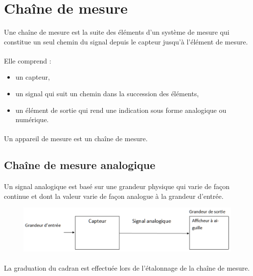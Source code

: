 \documentclass{article}
\begin{document}
\newpage
\section{Chaîne de mesure}
\paragraph{}
Une chaîne de mesure est la suite des éléments d'un système de mesure qui constitue un seul chemin du signal depuis le capteur jusqu'à l'élément de mesure.

\paragraph{}
Elle comprend :
\begin{itemize}
    \item un capteur,
    \item un signal qui suit un chemin dans la succession des éléments,
    \item un élément de sortie qui rend une indication sous forme analogique ou numérique.
\end{itemize}

\paragraph{}
Un appareil de mesure est un chaîne de mesure.

\subsection{Chaîne de mesure analogique}
\paragraph{}
Un signal analogique est basé sur une grandeur physique qui varie de façon continue et dont la valeur varie de façon analogue à la grandeur d'entrée.

\begin{figure}[H]
    \centering
    \includegraphics[width=0.8\linewidth]{images/chaine-mesure-analogique.png}    
\end{figure}

\paragraph{}
La graduation du cadran est effectuée lors de l'étalonnage de la chaîne de mesure.
\end{document}
